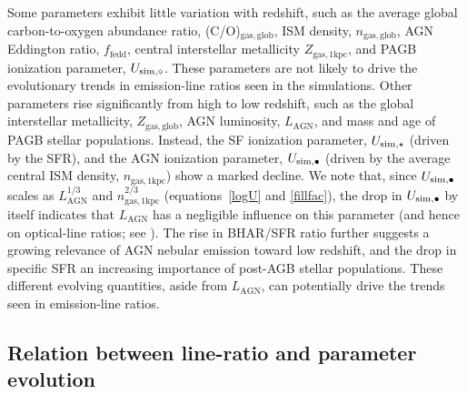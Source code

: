 \documentclass[fleqn,usenatbib]{mnras}
\begin{document}
Some parameters exhibit little variation with redshift, such as the
average global  carbon-to-oxygen abundance ratio, (C/O)$_{\mathrm{gas,
    glob}}$, ISM density, $n_{\mathrm{gas, glob}}$, AGN
Eddington ratio,  $f_\mathrm{fedd}$, central
interstellar metallicity  $Z_\mathrm{gas, 1kpc}$, and PAGB ionization
parameter, $U_{\rm sim,\diamond}$.  These parameters are not  likely
to drive the evolutionary trends in emission-line ratios  seen in the
simulations. Other parameters rise significantly from high to low
redshift,  such as the global interstellar metallicity, 
$Z_\mathrm{gas,glob}$, AGN luminosity,  $L_\mathrm{AGN}$,
and mass and age of PAGB stellar
populations. Instead, the SF  ionization parameter, $U_{\rm
sim,\star}$ (driven by the SFR), and the AGN ionization
parameter, $U_{\rm sim,\bullet}$ (driven by the average  central
ISM density, $n_\mathrm{gas,1kpc}$)  show a marked decline.  We
note that, since
$U_{\rm sim,\bullet}$ scales as $L_\mathrm{AGN}^{1/3}$ and 
$n_\mathrm{gas,1kpc}^{2/3}$
(equations~\ref{logU} and \ref{fillfac}), the drop in $U_{\rm sim,\bullet}$ 
by itself indicates that $L_\mathrm{AGN}$ has a negligible 
influence on this parameter (and hence on optical-line ratios; 
see \citealt{Feltre16}). The rise in BHAR/SFR ratio further suggests a  growing
relevance of AGN  nebular emission toward low redshift, and the drop
in specific SFR an increasing importance  of post-AGB stellar
populations.  These different evolving quantities, aside from $L_\mathrm{AGN}$, 
can potentially drive the
trends  seen in emission-line ratios. 


\subsection{Relation between line-ratio and parameter evolution}\label{levolparam}
\end{document}

